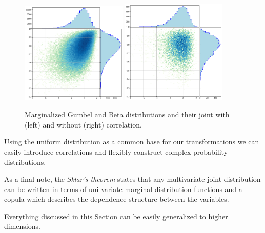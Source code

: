 \begin{figure}[htbp]
  \centering
  \includegraphics[width=0.45\textwidth]{figures/lesson6_18_0.png}
  \quad
  \includegraphics[width=0.45\textwidth]{figures/lesson6_20_0.png}
  \caption{Marginalized Gumbel and Beta distributions and their joint with (left) and without (right) correlation.}
  \label{fig:gumbel_beta_with_corr}
\end{figure}
    
Using the uniform distribution as a common base for our transformations
we can easily introduce correlations and flexibly construct complex
probability distributions. 

As a final note, the \emph{Sklar's theorem} states that any multivariate joint distribution
can be written in terms of uni-variate marginal distribution functions
and a copula which describes the dependence structure between the
variables.

Everything discussed in this Section can be easily generalized to higher dimensions.



